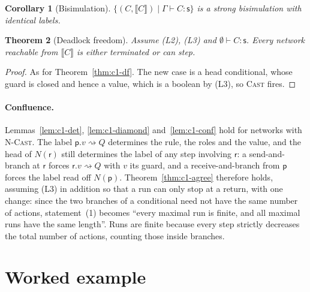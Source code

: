 \documentclass[11pt]{report}
\theoremstyle{plain}
\newtheorem{theorem}{Theorem}[chapter]
\newtheorem{corollary}[theorem]{Corollary}
\theoremstyle{definition}
\theoremstyle{remark}
\newcommand{\pp}{\mathsf{p}}
\newcommand{\rr}{\mathsf{r}}
\newcommand{\sr}{\mathsf{s}}
\newcommand{\castlbl}[3]{#1.#2 \rightsquigarrow #3}
\newcommand{\projn}[1]{\llbracket #1 \rrbracket}
\newcommand{\rn}[1]{{\normalfont\scshape #1}}
\begin{document}
\begin{corollary}[Bisimulation]\label{cor:c2-bisim}
  $\{(C,\projn{C})\mid\Gamma\vdash C:\sr\}$ is a strong bisimulation with
  identical labels.
\end{corollary}

\begin{theorem}[Deadlock freedom]\label{thm:c2-df}
  Assume (L2), (L3) and $\emptyset\vdash C:\sr$.  Every network reachable from
  $\projn{C}$ is either terminated or can step.
\end{theorem}
\begin{proof}
  As for Theorem~\ref{thm:c1-df}.  The new case is a head conditional, whose
  guard is closed and hence a value, which is a boolean by (L3), so \rn{Cast}
  fires.
\end{proof}

\paragraph{Confluence.}
Lemmas~\ref{lem:c1-det}, \ref{lem:c1-diamond} and~\ref{lem:c1-conf} hold for
networks with \rn{N-Cast}.  The label $\castlbl{\pp}{v}{Q}$ determines the
rule, the roles and the value, and the head of $N(\rr)$ still determines the
label of any step involving $\rr$: a send-and-branch at $\rr$ forces
$\castlbl{\rr}{v}{Q}$ with $v$ its guard, and a receive-and-branch from $\pp$
forces the label read off $N(\pp)$.  Theorem~\ref{thm:c1-agree} therefore
holds, assuming (L3) in addition so that a run can only stop at a return, with
one change: since the two branches of a conditional need not have
the same number of actions, statement~(1) becomes ``every maximal run is
finite, and all maximal runs have the same length''.  Runs are finite
because every step strictly decreases the total number of actions, counting
those inside branches.

\section{Worked example}
\label{sec:c2-example}
\end{document}
